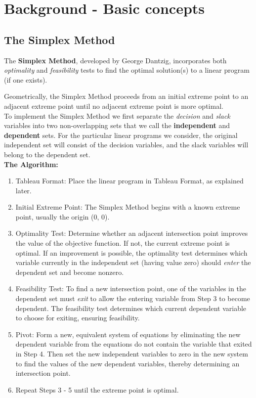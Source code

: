 \newpage
\section{Background - Basic concepts}
	\subsection{The Simplex Method}

		\qquad The \textbf{Simplex Method}, developed by George Dantzig, incorporates both \textit{optimality} and \textit{feasibility} tests to find the optimal solution(s) to a linear program (if one exists). 

		Geometrically, the Simplex Method
		proceeds from an initial extreme point to an adjacent extreme point until no adjacent extreme
		point is more optimal. \\

		\qquad To implement the Simplex Method we first separate the \textit{decision} and \textit{slack} variables into two non-overlapping sets that we call the \textbf{independent} and \textbf{dependent} sets. For the particular linear programs we consider, the original independent set will consist of the decision variables, and the slack variables will belong to the dependent set. \\[6pt]

		\textbf{The Algorithm:}
		\begin{enumerate}
			\item Tableau Format: Place the linear program in Tableau Format, as explained later.
			\item Initial Extreme Point: The Simplex Method begins with a known extreme point, usually
			the origin (0, 0).
			\item Optimality Test: Determine whether an adjacent intersection point improves the value of the objective function. If not, the current extreme point is optimal. If an improvement is possible, the optimality test determines which variable currently in the independent set (having value zero) should \textit{enter} the dependent set and become nonzero.
			\item Feasibility Test: To find a new intersection point, one of the variables in the dependent set must \textit{exit} to allow the entering variable from Step 3 to become dependent. The feasibility test determines which current dependent variable to choose for exiting, ensuring feasibility.
			\item Pivot: Form a new, equivalent system of equations by eliminating the new dependent variable from the equations do not contain the variable that exited in Step 4. Then set
			the new independent variables to zero in the new system to find the values of the new dependent variables, thereby determining an intersection point.
			\item Repeat Steps 3 - 5 until the extreme point is optimal.
			
		\end{enumerate}


